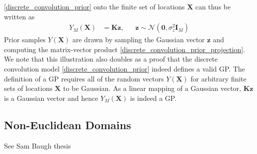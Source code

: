 \documentclass[12pt]{article}
\newcommand{\zeroVec}{\mathbf{0}}
\newcommand{\Gaussian}{\mathcal{N}}
\newcommand{\I}{\mathbf{I}}
\newcommand{\locMat}{\mathbf{X}}
\newcommand{\rf}{Y}
\newcommand{\numKnot}{M}
\newcommand{\kerMat}{\mathbf{K}}
\begin{document}
\ref{discrete_convolution_prior} onto the finite set of locations $\locMat$ can thus be written as 
\begin{align}
\rf_{\numKnot}(\locMat) &= \kerMat \mathbf{z}, &&\mathbf{z} \sim \Gaussian(\zeroVec, \sigma_{z}^2 \I_{\numKnot}) \label{discrete_convolution_prior_projection}
\end{align} 
Prior samples $\rf(\locMat)$ are drawn by sampling the Gaussian vector $\mathbf{z}$ and computing the matrix-vector product \ref{discrete_convolution_prior_projection}. We note that 
this illustration also doubles as a proof that the discrete convolution model \ref{discrete_convolution_prior} indeed defines a valid GP. The definition of a GP requires all of the 
random vectors $\rf(\locMat)$ for arbitrary finite sets of locations $\locMat$ to be Gaussian. As a linear mapping of a Gaussian vector, $\kerMat \mathbf{z}$ is a Gaussian vector and hence 
$\rf_{\numKnot}(\locMat)$ is indeed a GP. 



\subsection{Non-Euclidean Domains}
See Sam Baugh thesis
\end{document}
